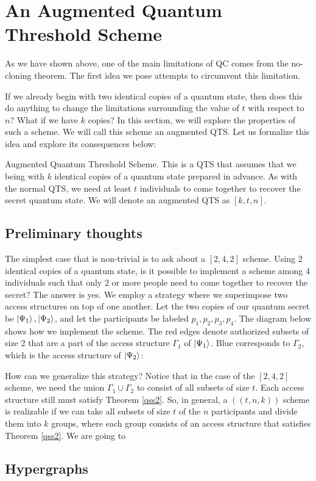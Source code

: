\chapter{An Augmented Quantum Threshold Scheme}

As we have shown above, one of the main limitations of QC comes from the no-cloning theorem. The first idea we pose attempts to circumvent this limitation. 

If we already begin with two identical copies of a quantum state, then does this do anything to change the limitations surrounding the value of $t$ with respect to $n$? What if we have $k$ copies? In this section, we will explore the properties of such a scheme. We will call this scheme an augmented QTS. Let us formalize this idea and explore its consequences below:

\theoremstyle{definition}
\begin{definition}{Augmented Quantum Threshold Scheme.}
     This is a QTS that assumes that we being with $k$ identical copies of a quantum state prepared in advance. As with the normal QTS, we need at least $t$ individuals to come together to recover the secret quantum state. We will denote an augmented QTS as $[k,t,n]$.
\end{definition}

\section{Preliminary thoughts}

The simplest case that is non-trivial is to ask about a $[2,4,2]$ scheme. Using 2 identical copies of a quantum state, is it possible to implement a scheme among 4 individuals such that only 2 or more people need to come together to recover the secret? The answer is yes. We employ a strategy where we superimpose two access structures on top of one another. Let the two copies of our quantum secret be $\ket{\Psi_1}, \ket{\Psi_2}$, and let the participants be labeled $p_1, p_2, p_3, p_4$. The diagram below shows how we implement the scheme. The red edges denote authorized subsets of size 2 that are a part of the access structure $\Gamma_1$ of $\ket{\Psi_1}$. Blue corresponds to $\Gamma_2$, which is the access structure of $\ket{\Psi_2}$:


How can we generalize this strategy? Notice that in the case of the $[2,4,2]$ scheme, we need the union $\Gamma_1 \cup \Gamma_2$ to consist of all subsets of size $t$. Each access structure still must satisfy Theorem \ref{qss2}. So, in general, a $((t,n,k))$ scheme is realizable if we can take all subsets of size $t$ of the $n$ participants and divide them into $k$ groups, where each group consists of an access structure that satisfies Theorem \ref{qss2}. We are going to 

\section{Hypergraphs}



